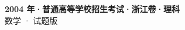 \documentclass[zihao=-4, a4paper]{ctexart}
\begin{document}
\begin{center}
  {\Large\bfseries 2004 年·普通高等学校招生考试·浙江卷·理科}\\[4pt]
  {\large 数学 · 试题版}
\end{center}
\medskip
{}

\end{document}
